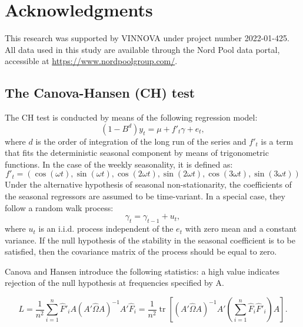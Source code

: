 \documentclass{article}
\begin{document}
\section*{Acknowledgments}
This research was supported by VINNOVA under project number 2022-01-425. 
All data used in this study are available through the Nord Pool data portal, accessible at \url{https://www.nordpoolgroup.com/}.



\begin{appendices} 
\section{The Canova-Hansen (CH) test} \label{app:1}
The CH test is conducted by means of the following regression model:
\begin{equation}
\label{equ:CH-regression}
(1 - B^d)y_t = \mu + f'_t \gamma + e_t,
\end{equation}
where $d$ is the order of integration of the long run of the series and $f'_t$ is a term that fits the deterministic seasonal component by means of trigonometric functions. In the case of the weekly seasonality, it is defined as:
\begin{equation}
f'_t = \left( \cos(\omega t), \sin(\omega t), \cos(2\omega t), \sin(2\omega t), \cos(3\omega t), \sin(3\omega t) \right)
\end{equation}
Under the alternative hypothesis of seasonal non-stationarity, the coefficients of the seasonal regressors are assumed to be time-variant. In a special case, they follow a random walk process:
\begin{equation}
\label{equ:Random-walk}
 \gamma_t = \gamma_{t-1} + u_t,
\end{equation}
where $u_t$ is an i.i.d. process independent of the $e_t$ with zero mean and a constant variance. If the null hypothesis of the stability in the seasonal coefficient is to be satisfied, then the covariance matrix of the process should be equal to zero. 

Canova and Hansen introduce the following statistics: a high value indicates rejection of the null hypothesis at frequencies specified by A. 


\begin{equation}
L = \frac{1}{n^2} \sum_{i=1}^{n} \hat{F}'_i A (A'\hat{\Omega}A)^{-1} A' \hat{F}_i = 
\frac{1}{n^2} \operatorname{tr}\!\!\left[(A'\hat{\Omega}A)^{-1} A' \!\left(\sum_{i=1}^{n} \hat{F}_i \hat{F}'_i\right)\! A \right].
\end{equation}



\end{appendices}
\end{document}
